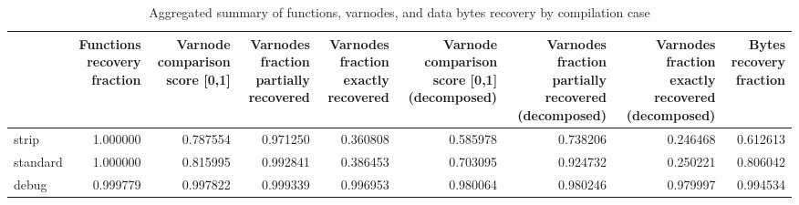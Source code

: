 \begin{table}
\centering
\caption{Aggregated summary of functions, varnodes, and data bytes recovery by compilation case}
\label{table:opts-overall-summary}
\begin{tabular}{lrrrrrrrr}
\toprule
{} &  Functions recovery fraction &  Varnode comparison score [0,1] &  Varnodes fraction partially recovered &  Varnodes fraction exactly recovered &  Varnode comparison score [0,1] (decomposed) &  Varnodes fraction partially recovered (decomposed) &  Varnodes fraction exactly recovered (decomposed) &  Bytes recovery fraction \\
\midrule
strip    &                     1.000000 &                        0.787554 &                               0.971250 &                             0.360808 &                                     0.585978 &                                           0.738206 &                                          0.246468 &                 0.612613 \\
standard &                     1.000000 &                        0.815995 &                               0.992841 &                             0.386453 &                                     0.703095 &                                           0.924732 &                                          0.250221 &                 0.806042 \\
debug    &                     0.999779 &                        0.997822 &                               0.999339 &                             0.996953 &                                     0.980064 &                                           0.980246 &                                          0.979997 &                 0.994534 \\
\bottomrule
\end{tabular}
\end{table}
